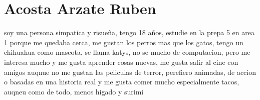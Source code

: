 \chapter{Acosta Arzate Ruben}
soy una persona simpatica y risueña, tengo 18 años, estudie en la prepa 5 en area 1 porque me quedaba cerca, me gustan los perros mas que los gatos, tengo un chihuahua como mascota, se llama katys, no se mucho de computacion, pero me interesa mucho y me gusta aprender cosas nuevas, me gusta salir al cine con amigos auqnue no me gustan las peliculas de terror, perefiero animadas, de accion o basadas en una historia real y me gusta comer mucho especialmente tacos, auqneu como de todo, menos higado y surimi





